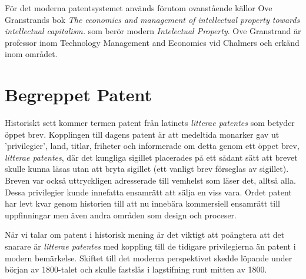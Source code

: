 För det moderna patentsystemet används förutom ovanstående källor Ove Granstrands bok
\emph{The economics and management of intellectual property towards intellectual capitalism.}
som berör modern \emph{Intelectual Property}. Ove Granstrand är professor inom
Technology Management and Economics vid Chalmers och erkänd inom området.





\section{Begreppet Patent} %
\label{sec:lit}

Historiskt sett kommer termen patent från latinets \emph{litterae patentes} som
betyder öppet brev. Kopplingen till dagens patent är att medeltida monarker gav
ut 'privilegier', land, titlar, friheter och informerade om detta genom ett
öppet brev, \emph{litterae patentes}, där det kungliga sigillet placerades på
ett sådant sätt att brevet skulle kunna läsas utan att bryta sigillet\cite{blackstone} (ett vanligt brev förseglas av sigillet). Breven var också uttryckligen adresserade till 
vemhelst som läser det, alltså alla. Dessa privilegier kunde innefatta ensamrätt
att sälja en viss vara. Ordet patent har levt kvar genom historien till 
att nu innebära kommersiell ensamrätt till uppfinningar men även andra områden som design och proceser. 

När vi talar om patent i historisk mening är det viktigt att poängtera att det 
snarare är \emph{litterae patentes} med koppling till de tidigare 
privilegierna än patent i modern bemärkelse. Skiftet till det moderna perspektivet skedde löpande under början av 1800-talet och skulle fastslås i lagstifning runt mitten av 1800.
